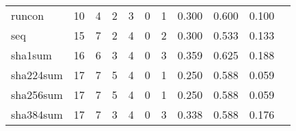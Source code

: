 \begin{longtable}{lp{1.2cm}p{1.2cm}p{1.2cm}p{1.2cm}p{1.2cm}p{1.2cm}p{1.2cm}p{1.2cm}p{1.2cm}p{1.2cm}}
runcon    &                                    10 &                                                  4 &                                                  2 &                                                  3 &                                                  0 &                                                  1 &                                         0.300 &                                              0.600 &                                              0.100 \\
seq       &                                    15 &                                                  7 &                                                  2 &                                                  4 &                                                  0 &                                                  2 &                                         0.300 &                                              0.533 &                                              0.133 \\
sha1sum   &                                    16 &                                                  6 &                                                  3 &                                                  4 &                                                  0 &                                                  3 &                                         0.359 &                                              0.625 &                                              0.188 \\
sha224sum &                                    17 &                                                  7 &                                                  5 &                                                  4 &                                                  0 &                                                  1 &                                         0.250 &                                              0.588 &                                              0.059 \\
sha256sum &                                    17 &                                                  7 &                                                  5 &                                                  4 &                                                  0 &                                                  1 &                                         0.250 &                                              0.588 &                                              0.059 \\
sha384sum &                                    17 &                                                  7 &                                                  3 &                                                  4 &                                                  0 &                                                  3 &                                         0.338 &                                              0.588 &                                              0.176 \\

\end{longtable}
